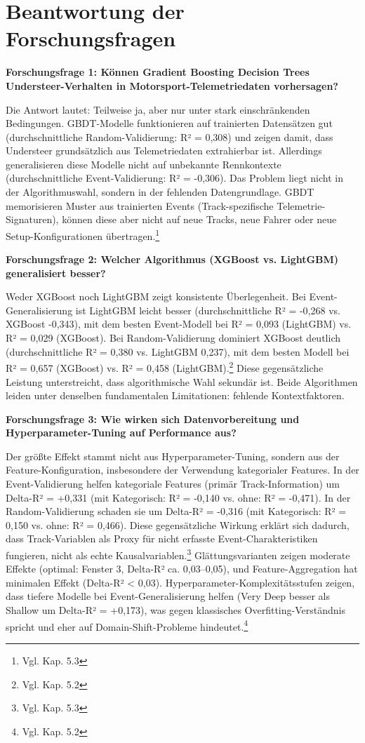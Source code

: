 \section{Beantwortung der Forschungsfragen}

\textbf{Forschungsfrage 1: Können Gradient Boosting Decision Trees Understeer-Verhalten in Motorsport-Telemetriedaten vorhersagen?}

Die Antwort lautet: Teilweise ja, aber nur unter stark einschränkenden Bedingungen. GBDT-Modelle funktionieren auf trainierten Datensätzen gut (durchschnittliche Random-Validierung: R² = 0,308) und zeigen damit, dass Understeer grundsätzlich aus Telemetriedaten extrahierbar ist. Allerdings generalisieren diese Modelle nicht auf unbekannte Rennkontexte (durchschnittliche Event-Validierung: R² = -0,306). Das Problem liegt nicht in der Algorithmuswahl, sondern in der fehlenden Datengrundlage. GBDT memorisieren Muster aus trainierten Events (Track-spezifische Telemetrie-Signaturen), können diese aber nicht auf neue Tracks, neue Fahrer oder neue Setup-Konfigurationen übertragen.\footnote{Vgl. Kap. 5.3}

\textbf{Forschungsfrage 2: Welcher Algorithmus (XGBoost vs. LightGBM) generalisiert besser?}

Weder XGBoost noch LightGBM zeigt konsistente Überlegenheit. Bei Event-Generalisierung ist LightGBM leicht besser (durchschnittliche R² = -0,268 vs. XGBoost -0,343), mit dem besten Event-Modell bei R² = 0,093 (LightGBM) vs. R² = 0,029 (XGBoost). Bei Random-Validierung dominiert XGBoost deutlich (durchschnittliche R² = 0,380 vs. LightGBM 0,237), mit dem besten Modell bei R² = 0,657 (XGBoost) vs. R² = 0,458 (LightGBM).\footnote{Vgl. Kap. 5.2} Diese gegensätzliche Leistung unterstreicht, dass algorithmische Wahl sekundär ist. Beide Algorithmen leiden unter denselben fundamentalen Limitationen: fehlende Kontextfaktoren.

\textbf{Forschungsfrage 3: Wie wirken sich Datenvorbereitung und Hyperparameter-Tuning auf Performance aus?}

Der größte Effekt stammt nicht aus Hyperparameter-Tuning, sondern aus der Feature-Konfiguration, insbesondere der Verwendung kategorialer Features. In der Event-Validierung helfen kategoriale Features (primär Track-Information) um Delta-R² = +0,331 (mit Kategorisch: R² = -0,140 vs. ohne: R² = -0,471). In der Random-Validierung schaden sie um Delta-R² = -0,316 (mit Kategorisch: R² = 0,150 vs. ohne: R² = 0,466). Diese gegensätzliche Wirkung erklärt sich dadurch, dass Track-Variablen als Proxy für nicht erfasste Event-Charakteristiken fungieren, nicht als echte Kausalvariablen.\footnote{Vgl. Kap. 5.3} Glättungsvarianten zeigen moderate Effekte (optimal: Fenster 3, Delta-R² ca. 0,03–0,05), und Feature-Aggregation hat minimalen Effekt (Delta-R² < 0,03). Hyperparameter-Komplexitätsstufen zeigen, dass tiefere Modelle bei Event-Generalisierung helfen (Very Deep besser als Shallow um Delta-R² = +0,173), was gegen klassisches Overfitting-Verständnis spricht und eher auf Domain-Shift-Probleme hindeutet.\footnote{Vgl. Kap. 5.2}



